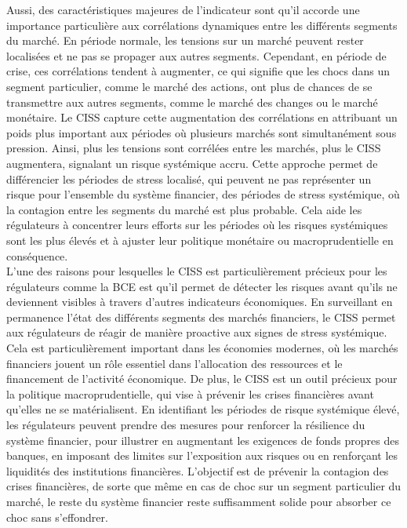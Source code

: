 Aussi, des caractéristiques majeures de l'indicateur sont qu'il accorde une importance particulière aux corrélations dynamiques entre les différents segments du marché. En période normale, les tensions sur un marché peuvent rester localisées et ne pas se propager aux autres segments. Cependant, en période de crise, ces corrélations tendent à augmenter, ce qui signifie que les chocs dans un segment particulier, comme le marché des actions, ont plus de chances de se transmettre aux autres segments, comme le marché des changes ou le marché monétaire. Le CISS capture cette augmentation des corrélations en attribuant un poids plus important aux périodes où plusieurs marchés sont simultanément sous pression. Ainsi, plus les tensions sont corrélées entre les marchés, plus le CISS augmentera, signalant un risque systémique accru. Cette approche permet de différencier les périodes de stress localisé, qui peuvent ne pas représenter un risque pour l'ensemble du système financier, des périodes de stress systémique, où la contagion entre les segments du marché est plus probable. Cela aide les régulateurs à concentrer leurs efforts sur les périodes où les risques systémiques sont les plus élevés et à ajuster leur politique monétaire ou macroprudentielle en conséquence.\\

L'une des raisons pour lesquelles le CISS est particulièrement précieux pour les régulateurs comme la BCE est qu'il permet de détecter les risques avant qu'ils ne deviennent visibles à travers d'autres indicateurs économiques. En surveillant en permanence l'état des différents segments des marchés financiers, le CISS permet aux régulateurs de réagir de manière proactive aux signes de stress systémique. Cela est particulièrement important dans les économies modernes, où les marchés financiers jouent un rôle essentiel dans l'allocation des ressources et le financement de l'activité économique. De plus, le CISS est un outil précieux pour la politique macroprudentielle, qui vise à prévenir les crises financières avant qu'elles ne se matérialisent. En identifiant les périodes de risque systémique élevé, les régulateurs peuvent prendre des mesures pour renforcer la résilience du système financier, pour illustrer en augmentant les exigences de fonds propres des banques, en imposant des limites sur l'exposition aux risques ou en renforçant les liquidités des institutions financières. L'objectif est de prévenir la contagion des crises financières, de sorte que même en cas de choc sur un segment particulier du marché, le reste du système financier reste suffisamment solide pour absorber ce choc sans s'effondrer.\\

